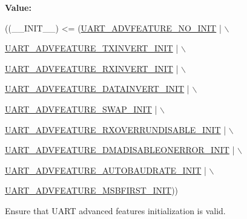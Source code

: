 {\bfseries Value\+:}
\begin{DoxyCode}
((\_\_INIT\_\_) <= (\hyperlink{group___u_a_r_t___advanced___features___initialization___type_gab696b28f33174d038e0bfd300c1b2a77}{UART\_ADVFEATURE\_NO\_INIT}                | \(\backslash\)
                                                            
      \hyperlink{group___u_a_r_t___advanced___features___initialization___type_ga17c49d1895d43bfd6e0cf993103731ae}{UART\_ADVFEATURE\_TXINVERT\_INIT}          | \(\backslash\)
                                                            
      \hyperlink{group___u_a_r_t___advanced___features___initialization___type_gad5a4923f3e771d276c6a5332e3945e2a}{UART\_ADVFEATURE\_RXINVERT\_INIT}          | \(\backslash\)
                                                            
      \hyperlink{group___u_a_r_t___advanced___features___initialization___type_ga3066937ab29631f78820865605e83628}{UART\_ADVFEATURE\_DATAINVERT\_INIT}        | \(\backslash\)
                                                            
      \hyperlink{group___u_a_r_t___advanced___features___initialization___type_ga56b48c24063e0f04b09f592c3ce7d2ac}{UART\_ADVFEATURE\_SWAP\_INIT}              | \(\backslash\)
                                                            
      \hyperlink{group___u_a_r_t___advanced___features___initialization___type_ga053355b64de3105a19f3e5560f3557e4}{UART\_ADVFEATURE\_RXOVERRUNDISABLE\_INIT}  | \(\backslash\)
                                                            
      \hyperlink{group___u_a_r_t___advanced___features___initialization___type_gafd2fb1991911b82d75556eafe228ef90}{UART\_ADVFEATURE\_DMADISABLEONERROR\_INIT} | \(\backslash\)
                                                            
      \hyperlink{group___u_a_r_t___advanced___features___initialization___type_ga09fdbb71292c899d6dc89a41e5752564}{UART\_ADVFEATURE\_AUTOBAUDRATE\_INIT}      | \(\backslash\)
                                                            
      \hyperlink{group___u_a_r_t___advanced___features___initialization___type_ga911654f44cd040f41871ec5af5ec1343}{UART\_ADVFEATURE\_MSBFIRST\_INIT}))
\end{DoxyCode}


Ensure that U\+A\+RT advanced features initialization is valid. 


